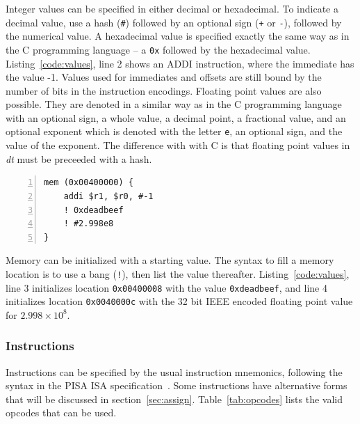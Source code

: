 Integer values can be specified in either decimal or hexadecimal.
To indicate a decimal value, use a hash (\texttt{\#}) followed 
by an optional sign (\texttt{+} or \texttt{-}), followed by the
numerical value. A hexadecimal value is specified exactly the 
same way as in the C programming language -- a \texttt{0x} followed
by the hexadecimal value.  Listing~\ref{code:values}, line 2 shows an ADDI
instruction, where the immediate has the value -1. Values 
used for immediates and offsets are 
still bound by the number of bits in the instruction encodings.
Floating point values are also possible. They are denoted in a similar way 
as in the C programming language with an optional sign, a whole value,
a decimal point, a fractional value, and an optional exponent which is
denoted with the letter \texttt{e}, an optional sign, and the value of 
the exponent.  The difference with with C is that floating point values 
in \emph{dt} must be preceeded with a hash.

\begin{lstlisting}[label=code:values,caption=Code example of immediate values and initialized memory locations,basicstyle=\footnotesize,numbers=left,numberstyle=\tiny,stepnumber=1, numbersep=6pt,frame=single,captionpos=b,escapechar=@]
mem (0x00400000) {
    addi $r1, $r0, #-1
    ! 0xdeadbeef
    ! #2.998e8
}
\end{lstlisting}

Memory can be initialized with a starting value.  The syntax 
to fill a memory location is to use a bang (\texttt{!}), then 
list the value thereafter.  Listing~\ref{code:values}, line 3 
initializes location \texttt{0x00400008} with the value \texttt{0xdeadbeef}, 
and line 4 initializes location \texttt{0x0040000c} with 
the 32 bit IEEE encoded floating point value for $2.998\times10^8$.

\subsubsection{Instructions}

Instructions can be specified by the usual instruction
mnemonics, following the syntax in the PISA ISA specification~\cite{burger97}.
Some instructions have alternative forms that will be 
discussed in section~\ref{sec:assign}.  Table~\ref{tab:opcodes}
lists the valid opcodes that can be used.


